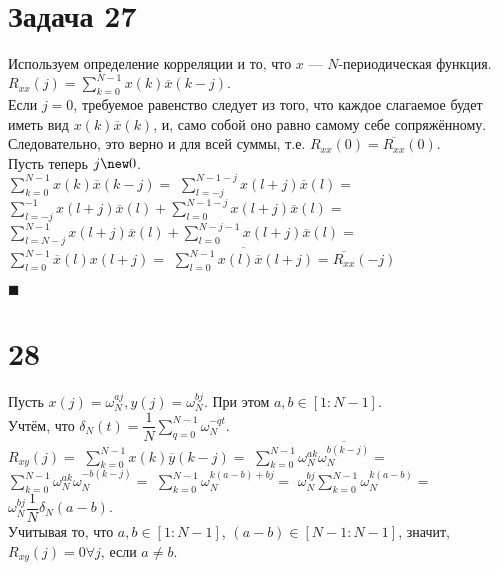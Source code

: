 \documentclass{article}
\title{}
\author{
	Дерюгин Денис, студент 561-й учебной группы
}
\date{\today}
\newcommand\proofend{\begin{flushright}$\blacksquare$\end{flushright}}
\begin{document}
\maketitle
\setcounter{MaxMatrixCols}{20}
\large {
\section*{Задача 27}
Используем определение корреляции и то, что $x$ --- $N$-периодическая функция.\\
$R_{xx}(j) = \sum\limits_{k=0}^{N-1} x(k) \overline{x}(k - j).$\\
Если $j = 0$, требуемое равенство следует из того, что каждое слагаемое будет иметь вид $x(k)\overline{x}(k)$, и, само собой оно равно самому себе сопряжённому. Следовательно, это верно и для всей суммы, т.е. $R_{xx}(0) = \overline{R_{xx}}(0)$.\\
Пусть теперь $j \new 0$.\\

$\sum\limits_{k = 0}^{N - 1} x(k) \overline{x}(k - j) =$
$\sum\limits_{l = -j}^{N - 1 - j} x(l + j) \overline{x}(l) =$
$\sum\limits_{l = -j}^{- 1} x(l + j) \overline{x}(l) + \sum\limits_{l = 0}^{N - 1 - j} x(l + j) \overline{x}(l) = $
$\sum\limits_{l = N - j}^{N - 1} x(l + j) \overline{x}(l) + \sum\limits_{l = 0}^{N - j - 1} x(l + j) \overline{x}(l) = $
$\sum\limits_{l = 0}^{N - 1} \overline{x}(l) x(l + j) = $
$\overline{\sum\limits_{l = 0}^{N - 1} x(l) \overline{x}(l + j)} = \overline{R_{xx}}(-j)$
\proofend

\section*{28}
Пусть $x(j) = \omega_N^{aj}, y(j) = \omega_N^{bj}$. При этом $a, b \in [1 : N - 1]$.\\
Учтём, что $\delta_N(t) = \dfrac{1}{N}\sum\limits_{q=0}^{N-1}\omega_N^{-qt}$.\\
$R_{xy}(j) = $
$\sum\limits_{k = 0}^{N - 1} x(k) \overline{y} (k - j) =$
$\sum\limits_{k = 0}^{N - 1} \omega_N^{ak} \overline{\omega_N^{b(k-j)}} =$
$\sum\limits_{k = 0}^{N - 1} \omega_N^{ak} \omega_N^{-b(k - j)} =$
$\sum\limits_{k = 0}^{N - 1} \omega_N^{k(a - b) + bj} = $
$\omega_N^{bj}\sum\limits_{k = 0}^{N - 1} \omega_N^{k(a - b)} = $
$\omega_N^{bj}\dfrac{1}{N}\delta_N(a - b).$\\

Учитывая то, что $a, b \in [1 : N -1]$, $(a - b) \in [N - 1 : N - 1]$, значит, $R_{xy}(j) = 0 \forall j$, если $a \neq b$.

}
\end{document}
